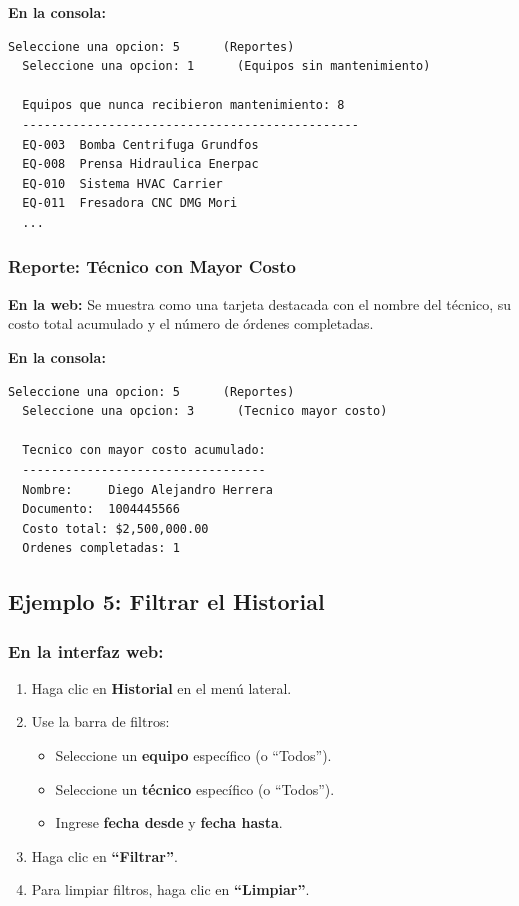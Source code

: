 \documentclass[12pt, a4paper]{article}
\begin{document}
\textbf{En la consola:}
\begin{lstlisting}[style=console]
  Seleccione una opcion: 5      (Reportes)
  Seleccione una opcion: 1      (Equipos sin mantenimiento)

  Equipos que nunca recibieron mantenimiento: 8
  -----------------------------------------------
  EQ-003  Bomba Centrifuga Grundfos
  EQ-008  Prensa Hidraulica Enerpac
  EQ-010  Sistema HVAC Carrier
  EQ-011  Fresadora CNC DMG Mori
  ...
\end{lstlisting}

\subsubsection{Reporte: T\'ecnico con Mayor Costo}

\textbf{En la web:} Se muestra como una tarjeta destacada con el nombre del t\'ecnico, su costo total acumulado y el n\'umero de \'ordenes completadas.

\textbf{En la consola:}
\begin{lstlisting}[style=console]
  Seleccione una opcion: 5      (Reportes)
  Seleccione una opcion: 3      (Tecnico mayor costo)

  Tecnico con mayor costo acumulado:
  ----------------------------------
  Nombre:     Diego Alejandro Herrera
  Documento:  1004445566
  Costo total: $2,500,000.00
  Ordenes completadas: 1
\end{lstlisting}

\subsection{Ejemplo 5: Filtrar el Historial}

\subsubsection{En la interfaz web:}
\begin{enumerate}[leftmargin=2em]
    \item Haga clic en \textbf{Historial} en el men\'u lateral.
    \item Use la barra de filtros:
    \begin{itemize}
        \item Seleccione un \textbf{equipo} espec\'ifico (o ``Todos'').
        \item Seleccione un \textbf{t\'ecnico} espec\'ifico (o ``Todos'').
        \item Ingrese \textbf{fecha desde} y \textbf{fecha hasta}.
    \end{itemize}
    \item Haga clic en \textbf{``Filtrar''}.
    \item Para limpiar filtros, haga clic en \textbf{``Limpiar''}.
\end{enumerate}
\end{document}
